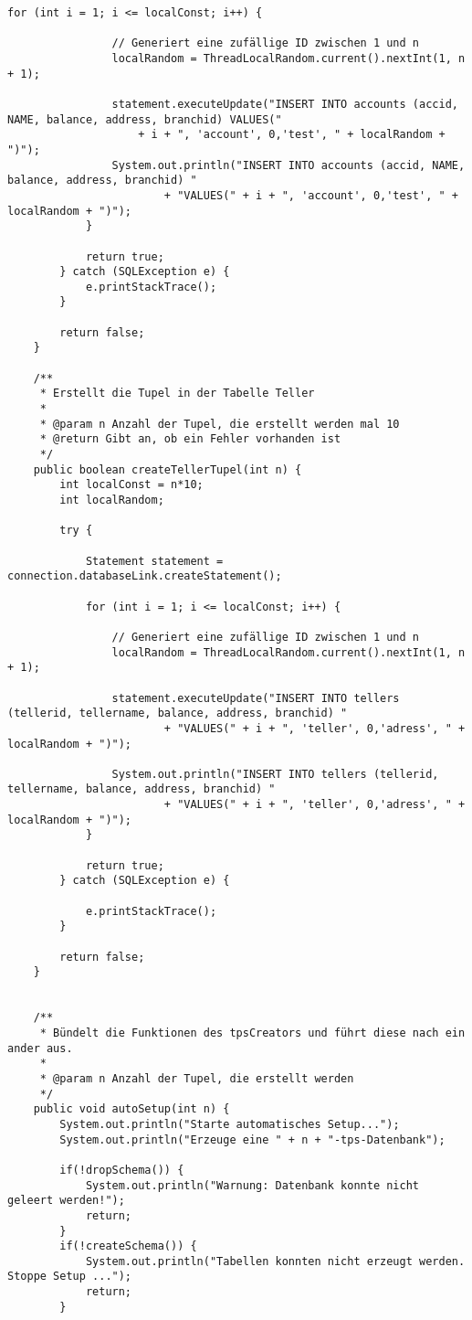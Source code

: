 \begin{lstlisting}[caption={tpsCreator}, label={lst:tpsv1}]
			for (int i = 1; i <= localConst; i++) {
				
				// Generiert eine zufällige ID zwischen 1 und n
				localRandom = ThreadLocalRandom.current().nextInt(1, n + 1);
								
				statement.executeUpdate("INSERT INTO accounts (accid, NAME, balance, address, branchid) VALUES("
					+ i + ", 'account', 0,'test', " + localRandom + ")");
				System.out.println("INSERT INTO accounts (accid, NAME, balance, address, branchid) "
						+ "VALUES(" + i + ", 'account', 0,'test', " + localRandom + ")");
			}

			return true;
		} catch (SQLException e) {
			e.printStackTrace();
		}
		
		return false;
	}
	
	/**
	 * Erstellt die Tupel in der Tabelle Teller
	 * 
	 * @param n Anzahl der Tupel, die erstellt werden mal 10
	 * @return Gibt an, ob ein Fehler vorhanden ist
	 */
	public boolean createTellerTupel(int n) {
		int localConst = n*10;
		int localRandom;
		
		try {
			
			Statement statement = connection.databaseLink.createStatement();

			for (int i = 1; i <= localConst; i++) {
				
				// Generiert eine zufällige ID zwischen 1 und n
				localRandom = ThreadLocalRandom.current().nextInt(1, n + 1);
								
				statement.executeUpdate("INSERT INTO tellers (tellerid, tellername, balance, address, branchid) "
						+ "VALUES(" + i + ", 'teller', 0,'adress', " + localRandom + ")");

				System.out.println("INSERT INTO tellers (tellerid, tellername, balance, address, branchid) "
						+ "VALUES(" + i + ", 'teller', 0,'adress', " + localRandom + ")");
			}

			return true;
		} catch (SQLException e) {

			e.printStackTrace();
		}
		
		return false;
	}
	
	
	/**
	 * Bündelt die Funktionen des tpsCreators und führt diese nach ein ander aus.
	 * 
	 * @param n Anzahl der Tupel, die erstellt werden
	 */
	public void autoSetup(int n) {
		System.out.println("Starte automatisches Setup...");
		System.out.println("Erzeuge eine " + n + "-tps-Datenbank");
		
		if(!dropSchema()) {
			System.out.println("Warnung: Datenbank konnte nicht geleert werden!");
			return;
		}
		if(!createSchema()) {
			System.out.println("Tabellen konnten nicht erzeugt werden. Stoppe Setup ...");
			return;
		}
		

\end{lstlisting}
